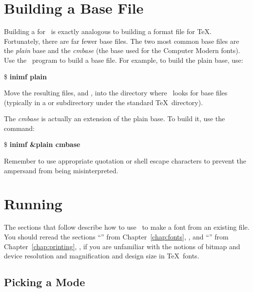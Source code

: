 \section{Building a Base File}
\label{sec:mf:gettingstarted}

Building a  for \MF\ is 
exactly analogous to building
a format file for \TeX.  Fortunately, there are far fewer base files.
The two most common base files are the \textit{plain}
 base and the 
\textit{cmbase} (the
base used for the Computer Modern fonts).  Use the \iniMF\ program to build a base file.  For 
example, to build the plain base,
use:

\begin{ttindent}
\$ \textbf{inimf plain}
\end{ttindent}

Move the resulting files,  and ,
into the directory where \MF\ looks for base files (typically in a 
 or  subdirectory under the standard
\TeX\ directory).

The \textit{cmbase} is actually an extension of the plain base.  To build
it, use the command:

\begin{ttindent}
\$ \textbf{inimf &plain cmbase}
\end{ttindent}

Remember to use appropriate quotation or shell escape characters to prevent
the ampersand from being misinterpreted.

\section{Running \protect\MF}

The sections that 
follow describe how to use \MF\ to make a font from
an existing  file.  You should reread the sections
``'' from Chapter~\ref{chap:fonts},
{\it {}}, and ``'' from
Chapter~\ref{chap:printing}, {\it {}\/},
if you are unfamiliar with the notions of
bitmap and device resolution and magnification and design size in
\TeX\ fonts.

\subsection{Picking a Mode}


